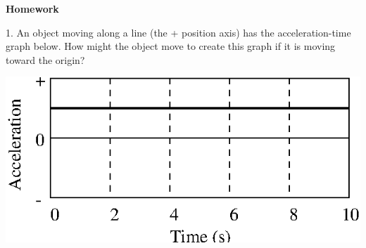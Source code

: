 \textbf{Homework} 

1. An object moving along a line (the + position axis) has the acceleration-time graph below. How might the object move to create this graph if it is moving
toward the origin?

\vspace{0.3cm}
{\par\centering \includegraphics{slowing/slowing_fig6.eps} \par}
\vspace{0.3cm}

